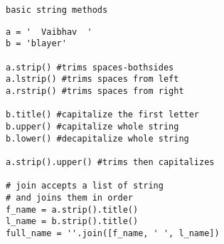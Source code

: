 \begin{center}
\texttt{basic string methods}
\end{center}
\begin{verbatim}
a = '  Vaibhav  '
b = 'blayer'

a.strip() #trims spaces-bothsides
a.lstrip() #trims spaces from left
a.rstrip() #trims spaces from right

b.title() #capitalize the first letter
b.upper() #capitalize whole string
b.lower() #decapitalize whole string

a.strip().upper() #trims then capitalizes

# join accepts a list of string
# and joins them in order
f_name = a.strip().title()
l_name = b.strip().title()
full_name = ''.join([f_name, ' ', l_name])
\end{verbatim}
